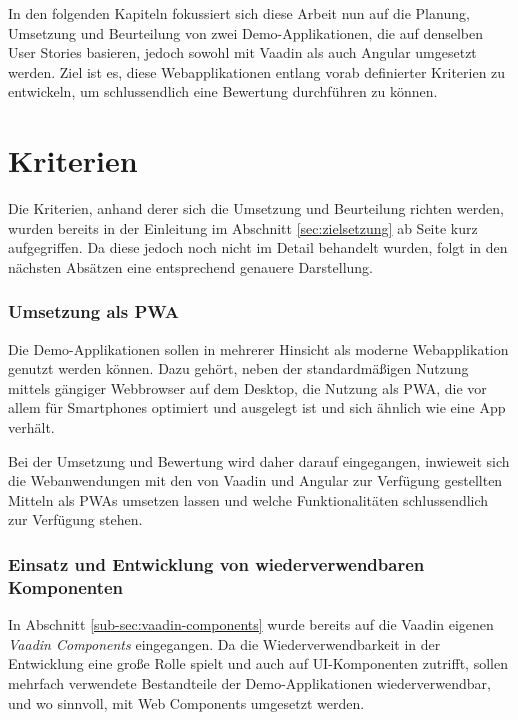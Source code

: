 \documentclass[a4paper,12pt,twoside]{scrreprt}
\begin{document}
In den folgenden Kapiteln fokussiert sich diese Arbeit nun auf die Planung, Umsetzung und Beurteilung von zwei Demo-Applikationen, die auf denselben User Stories basieren, jedoch sowohl mit Vaadin als auch Angular umgesetzt werden. Ziel ist es, diese Webapplikationen entlang vorab definierter Kriterien zu entwickeln, um schlussendlich eine Bewertung durchführen zu können.

\section{Kriterien}
\label{sec:kriterien}
Die Kriterien, anhand derer sich die Umsetzung und Beurteilung richten werden, wurden bereits in der Einleitung im Abschnitt \ref{sec:zielsetzung} ab Seite \pageref{sec:zielsetzung} kurz aufgegriffen. Da diese jedoch noch nicht im Detail behandelt wurden, folgt in den nächsten Absätzen eine entsprechend genauere Darstellung.

\subsubsection*{Umsetzung als \acl{PWA}}
\label{sub-sec:kriterien-pwa}
Die Demo-Applikationen sollen in mehrerer Hinsicht als moderne Webapplikation genutzt werden können. Dazu gehört, neben der standardmäßigen Nutzung mittels gängiger Webbrowser auf dem Desktop, die Nutzung als \ac{PWA}, die vor allem für Smartphones optimiert und ausgelegt ist und sich ähnlich wie eine App verhält.

\clearpage

Bei der Umsetzung und Bewertung wird daher darauf eingegangen, inwieweit sich die Webanwendungen mit den von Vaadin und Angular zur Verfügung gestellten Mitteln als \acp{PWA} umsetzen lassen und welche Funktionalitäten schlussendlich zur Verfügung stehen.

\subsubsection*{Einsatz und Entwicklung von wiederverwendbaren Komponenten}
\label{sub-sec:kriterien-web-components}
In Abschnitt \ref{sub-sec:vaadin-components} wurde bereits auf die Vaadin eigenen \textit{Vaadin Components} eingegangen. Da die Wiederverwendbarkeit in der Entwicklung eine große Rolle spielt und auch auf \acs{UI}-Komponenten zutrifft, sollen mehrfach verwendete Bestandteile der Demo-Applikationen wiederverwendbar, und wo sinnvoll, mit Web Components umgesetzt werden.
\end{document}
